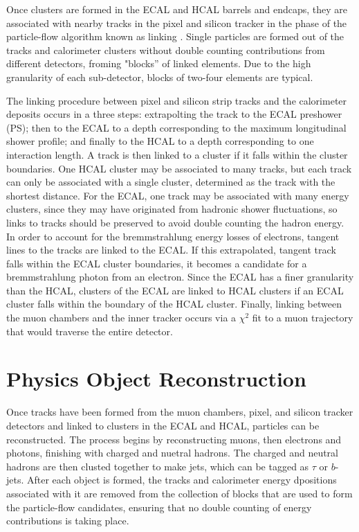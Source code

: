 \par Once clusters are formed in the ECAL and HCAL barrels and
endcaps, they are associated with nearby tracks in the pixel and
silicon tracker in the phase of the particle-flow algorithm known as
linking \cite{CMS-PAS-PFT-09-001}.  Single particles are formed out of
the tracks and calorimeter clusters without double counting
contributions from different detectors, froming "blocks'' of linked
elements.  Due to the high granularity of each sub-detector, blocks of
two-four elements are typical.  

\par The linking procedure between pixel and silicon strip tracks and
the calorimeter deposits occurs in a three steps: extrapolting the
track to the ECAL preshower (PS); then to the ECAL to a depth
corresponding to the maximum longitudinal shower profile; and finally
to the HCAL to a depth corresponding to one interaction length.  A
track is then linked to a cluster if it falls within the cluster
boundaries.  One HCAL cluster may be associated to many tracks, but
each track can only be associated with a single cluster, determined as
the track with the shortest distance.  For the ECAL, one track may be
associated with many energy clusters, since they may have originated
from hadronic shower fluctuations, so links to tracks should be
preserved to avoid double counting the hadron energy.  In order to
account for the bremmstrahlung energy losses of electrons, tangent
lines to the tracks are linked to the ECAL.  If this extrapolated,
tangent track falls within the ECAL cluster boundaries, it becomes a
candidate for a bremmstrahlung photon from an electron.  Since the
ECAL has a finer granularity than the HCAL, clusters of the ECAL are
linked to HCAL clusters if an ECAL cluster falls within the boundary
of the HCAL cluster.   Finally, linking between the muon chambers and
the inner tracker occurs via a $\chi^{2}$ fit to a muon trajectory
that would traverse the entire detector.    

\section{Physics Object Reconstruction}
\label{physics_object_recostruction}

\par Once tracks have been formed from the muon chambers, pixel, and
silicon tracker detectors and linked to clusters in the ECAL and HCAL,
particles can be reconstructed.  The process begins by reconstructing
muons, then electrons and photons, finishing with charged and nuetral
hadrons.  The charged and neutral hadrons are then clusted together to
make jets, which can be tagged as $\tau$ or $b$-jets.  After each
object is formed, the tracks and calorimeter energy dpositions
associated with it are removed from the collection of blocks that are
used to form the particle-flow candidates, ensuring that no double
counting of energy contributions is taking place.  


